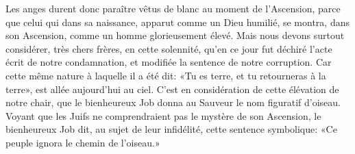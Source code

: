Les anges durent donc paraître vêtus de blanc au moment de l’Ascension,
	parce que celui qui dans sa naissance, apparut comme un Dieu humilié,
	se montra, dans son Ascension, comme un homme glorieusement élevé.
Mais nous devons surtout considérer, très chers frères, en cette solennité,
	qu’en ce jour fut déchiré l’acte écrit de notre condamnation,
	et modifiée la sentence de notre corruption.
Car cette même nature à laquelle il a été dit:
	«Tu es terre, et tu retourneras à la terre»,
	est allée aujourd’hui au ciel.
C’est en considération de cette élévation de notre chair,
	que le bienheureux Job donna au Sauveur le nom figuratif d’oiseau.
Voyant que les Juifs ne comprendraient pas le mystère de son Ascension,
	le bienheureux Job dit, au sujet de leur infidélité,
	cette sentence symbolique:
	«Ce peuple ignora le chemin de l’oiseau.»
